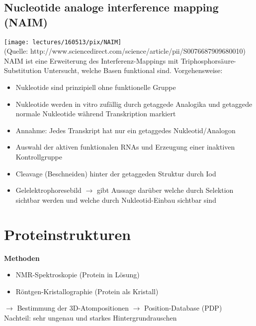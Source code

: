 \subsection{Nucleotide analoge interference mapping (NAIM)}
\texttt{[image: lectures/160513/pix/NAIM]} \\
(Quelle: http://www.sciencedirect.com/science/article/pii/S0076687909680010) \\
 
NAIM ist eine Erweiterung des Interferenz-Mappings mit Triphosphorsäure-Substitution
Untersucht, welche Basen funktional sind. Vorgehensweise:
\begin{itemize}
\item Nukleotide sind prinzipiell ohne funktionelle Gruppe
\item Nukleotide werden in vitro zufällig durch getaggede Analogika und getaggede normale Nukleotide während Transkription markiert
\item Annahme: Jedes Transkript hat nur ein getaggedes Nukleotid/Analogon
\item Auswahl der aktiven funktionalen RNAs und Erzeugung einer inaktiven Kontrollgruppe
\item Cleavage (Beschneiden) hinter der getaggeden Struktur durch Iod
\item Gelelektrophoresebild $\rightarrow$ gibt Aussage darüber welche durch Selektion sichtbar werden und welche durch Nukleotid-Einbau sichtbar sind
\end{itemize}

\section{Proteinstrukturen}
\textbf{Methoden}
\begin{itemize}
\item NMR-Spektroskopie (Protein in Lösung)
\item Röntgen-Kristallographie (Protein als Kristall)
\end{itemize}
$\rightarrow$ Bestimmung der 3D-Atompositionen $\rightarrow$ Position-Database (PDP)\\

Nachteil: sehr ungenau und starkes Hintergrundrauschen